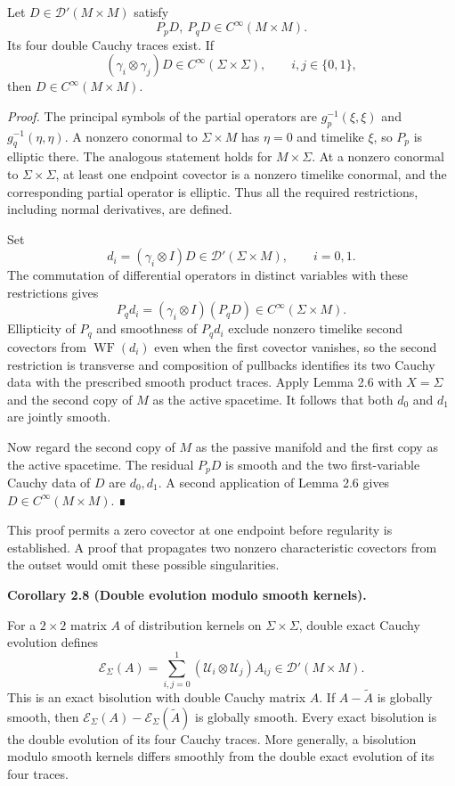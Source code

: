 \documentclass[
  english,
  11pt,
  reqno]{amsart}
\makeatletter
\newcommand{\pandocstatementheading}[1]{%
  \par\if@nobreak\else
    \addpenalty{\@beginparpenalty}%
    \addvspace{.5\baselineskip plus .2\baselineskip minus .2\baselineskip}%
  \fi
  {\normalfont\bfseries #1\par}%
  \nobreak\@afterindenttrue\@afterheading
}
\makeatother
\begin{document}
Let \(D\in\mathcal D'(M\times M)\) satisfy \[
P_pD,\ P_qD\in C^\infty(M\times M).
\] Its four double Cauchy traces exist. If \[
(\gamma_i\otimes\gamma_j)D
\in C^\infty(\Sigma\times\Sigma),
\qquad i,j\in\{0,1\},
\] then \(D\in C^\infty(M\times M)\).

\emph{Proof.} The principal symbols of the partial operators are
\(g_p^{-1}(\xi,\xi)\) and \(g_q^{-1}(\eta,\eta)\). A nonzero conormal to
\(\Sigma\times M\) has \(\eta=0\) and timelike \(\xi\), so \(P_p\) is
elliptic there. The analogous statement holds for \(M\times\Sigma\). At
a nonzero conormal to \(\Sigma\times\Sigma\), at least one endpoint
covector is a nonzero timelike conormal, and the corresponding partial
operator is elliptic. Thus all the required restrictions, including
normal derivatives, are defined.

Set \[
d_i=(\gamma_i\otimes I)D
\in\mathcal D'(\Sigma\times M),\qquad i=0,1.
\] The commutation of differential operators in distinct variables with
these restrictions gives \[
P_qd_i=(\gamma_i\otimes I)(P_qD)\in C^\infty(\Sigma\times M).
\] Ellipticity of \(P_q\) and smoothness of \(P_qd_i\) exclude nonzero
timelike second covectors from \(\operatorname{WF}(d_i)\) even when the
first covector vanishes, so the second restriction is transverse and
composition of pullbacks identifies its two Cauchy data with the
prescribed smooth product traces. Apply Lemma 2.6 with \(X=\Sigma\) and
the second copy of \(M\) as the active spacetime. It follows that both
\(d_0\) and \(d_1\) are jointly smooth.

Now regard the second copy of \(M\) as the passive manifold and the
first copy as the active spacetime. The residual \(P_pD\) is smooth and
the two first-variable Cauchy data of \(D\) are \(d_0,d_1\). A second
application of Lemma 2.6 gives \(D\in C^\infty(M\times M)\). ∎

This proof permits a zero covector at one endpoint before regularity is
established. A proof that propagates two nonzero characteristic
covectors from the outset would omit these possible singularities.

\pandocstatementheading{\protect{}\label{cor:double-evolution-quotient}Corollary 2.8 (Double evolution modulo smooth kernels).}

For a \(2\times2\) matrix \(A\) of distribution kernels on
\(\Sigma\times\Sigma\), double exact Cauchy evolution defines \[
\mathcal E_\Sigma(A)
=\sum_{i,j=0}^1
(\mathcal U_i\otimes\mathcal U_j)A_{ij}
\in\mathcal D'(M\times M).
\] This is an exact bisolution with double Cauchy matrix \(A\). If
\(A-\widetilde A\) is globally smooth, then
\(\mathcal E_\Sigma(A)-\mathcal E_\Sigma(\widetilde A)\) is globally
smooth. Every exact bisolution is the double evolution of its four
Cauchy traces. More generally, a bisolution modulo smooth kernels
differs smoothly from the double exact evolution of its four traces.
\end{document}
